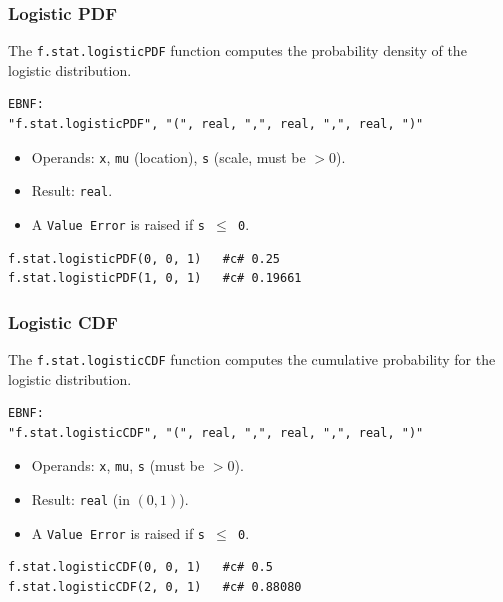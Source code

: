 \subsubsection{Logistic PDF}
The \texttt{f.stat.logisticPDF} function computes the probability density of the logistic distribution.
\begin{verbatim}
EBNF:
"f.stat.logisticPDF", "(", real, ",", real, ",", real, ")"
\end{verbatim}
\begin{itemize}
\item Operands: \texttt{x}, \texttt{mu} (location), \texttt{s} (scale, must be $> 0$).
\item Result: \texttt{real}.
\item A \texttt{Value Error} is raised if \texttt{s $\leq$ 0}.
\end{itemize}
\begin{verbatim}
f.stat.logisticPDF(0, 0, 1)   #c# 0.25
f.stat.logisticPDF(1, 0, 1)   #c# 0.19661
\end{verbatim}

\subsubsection{Logistic CDF}
The \texttt{f.stat.logisticCDF} function computes the cumulative probability for the logistic distribution.
\begin{verbatim}
EBNF:
"f.stat.logisticCDF", "(", real, ",", real, ",", real, ")"
\end{verbatim}
\begin{itemize}
\item Operands: \texttt{x}, \texttt{mu}, \texttt{s} (must be $> 0$).
\item Result: \texttt{real} (in $(0, 1)$).
\item A \texttt{Value Error} is raised if \texttt{s $\leq$ 0}.
\end{itemize}
\begin{verbatim}
f.stat.logisticCDF(0, 0, 1)   #c# 0.5
f.stat.logisticCDF(2, 0, 1)   #c# 0.88080
\end{verbatim}

